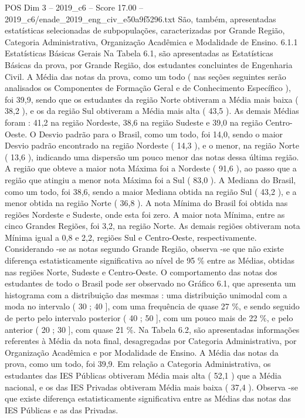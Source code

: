 \begin{textsample}{POS Dim 3 – 2019\_c6 – Score 17.00 – 2019\_c6/enade\_2019\_eng\_civ\_e50a9f5296.txt}
São, também, apresentadas estatísticas selecionadas de subpopulações, caracterizadas por Grande Região, Categoria Administrativa, Organização Acadêmica e Modalidade de Ensino. 6.1.1 Estatísticas Básicas Gerais Na Tabela 6.1, são apresentadas as Estatísticas Básicas da prova, por Grande Região, dos estudantes concluintes de Engenharia Civil.
A Média das notas da prova, como um todo ( nas seções seguintes serão analisados os Componentes de Formação Geral e de Conhecimento Específico ), foi 39,9, sendo que os estudantes da região Norte obtiveram a Média mais baixa ( 38,2 ), e os da região Sul obtiveram a Média mais alta ( 43,5 ).
As demais Médias foram : 41,2 na região Nordeste, 38,6 na região Sudeste e 39,0 na região Centro-Oeste.
O Desvio padrão para o Brasil, como um todo, foi 14,0, sendo o maior Desvio padrão encontrado na região Nordeste ( 14,3 ), e o menor, na região Norte ( 13,6 ), indicando uma dispersão um pouco menor das notas dessa última região.
A região que obteve a maior nota Máxima foi a Nordeste ( 91,6 ), ao passo que a região que atingiu a menor nota Máxima foi a Sul ( 83,0 ).
A Mediana do Brasil, como um todo, foi 38,6, sendo a maior Mediana obtida na região Sul ( 43,2 ), e a menor obtida na região Norte ( 36,8 ).
A nota Mínima do Brasil foi obtida nas regiões Nordeste e Sudeste, onde esta foi zero.
A maior nota Mínima, entre as cinco Grandes Regiões, foi 3,2, na região Norte.
As demais regiões obtiveram nota Mínima igual a 0,8 e 2,2, regiões Sul e Centro-Oeste, respectivamente.
Considerando -se as notas segundo Grande Região, observa -se que não existe diferença estatisticamente significativa ao nível de 95 \% entre as Médias, obtidas nas regiões Norte, Sudeste e Centro-Oeste.
O comportamento das notas dos estudantes de todo o Brasil pode ser observado no Gráfico 6.1, que apresenta um histograma com a distribuição das mesmas : uma distribuição unimodal com a moda no intervalo ( 30 ; 40 ], com uma frequência de quase 27 \%, e sendo seguido de perto pelo intervalo posterior ( 40 ; 50 ], com um pouco mais de 22 \%, e pelo anterior ( 20 ; 30 ], com quase 21 \%.
Na Tabela 6.2, são apresentadas informações referentes à Média da nota final, desagregadas por Categoria Administrativa, por Organização Acadêmica e por Modalidade de Ensino.
A Média das notas da prova, como um todo, foi 39,9.
Em relação a Categoria Administrativa, os estudantes das IES Públicas obtiveram Média mais alta ( 52,1 ) que a Média nacional, e os das IES Privadas obtiveram Média mais baixa ( 37,4 ).
Observa -se que existe diferença estatisticamente significativa entre as Médias das notas das IES Públicas e as das Privadas.

\end{textsample}

